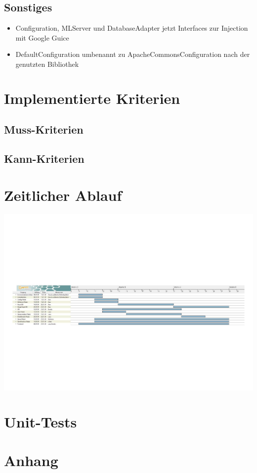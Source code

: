 \documentclass[a4paper]{scrreprt}
\begin{document}
\section{Sonstiges}
\begin{itemize}
    \item Configuration, MLServer und DatabaseAdapter jetzt Interfaces zur Injection mit Google Guice
    \item DefaultConfiguration umbenannt zu ApacheCommonsConfiguration nach der genutzten Bibliothek
\end{itemize}


\chapter{Implementierte Kriterien}

\section{Muss-Kriterien}

\section{Kann-Kriterien}


\chapter{Zeitlicher Ablauf}

\includegraphics[width=\linewidth]{img/gantt.pdf}

\chapter{Unit-Tests}

	
\chapter{Anhang}
\end{document}
